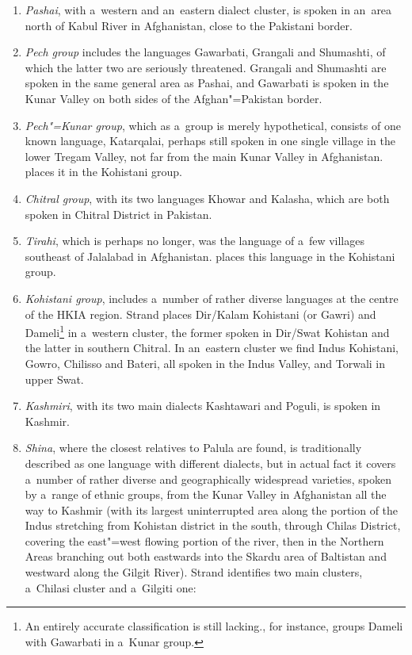 \begin{enumerate}
\item \textit{Pashai}, with a~western and an~eastern dialect cluster, is spoken in an~area north of Kabul River in Afghanistan, close to the Pakistani border. 


\item \textit{Pech group} includes the languages Gawarbati, Grangali and Shumashti, of which the latter two are seriously threatened. Grangali and Shumashti are spoken in the same general area as Pashai, and Gawarbati is spoken in the Kunar Valley on both sides of the Afghan"=Pakistan border. 


\item \textit{Pech"=Kunar group}, which as a~group is merely hypothetical, consists of one known language, Katarqalai, perhaps still spoken in one single village in the lower Tregam Valley, not far from the main Kunar Valley in Afghanistan. \citet[825]{bashir2003} places it in the Kohistani group.


\item \textit{Chitral group}, with its two languages Khowar and Kalasha, which are both spoken in Chitral District in Pakistan.


\item \textit{Tirahi}, which is perhaps no longer, was the language of a~few villages southeast of Jalalabad in Afghanistan. \citet[824]{bashir2003} places this language in the Kohistani group.


\item \textit{Kohistani group}, includes a~number of rather diverse languages at the centre of the HKIA region. Strand places Dir/Kalam Kohistani (or Gawri) and Dameli\footnote{An entirely accurate classification is still lacking.\citet[824]{bashir2003}, for instance, groups Dameli with Gawarbati in a~Kunar group.} in a~western cluster, the former spoken in Dir/Swat Kohistan and the latter in southern Chitral. In an~eastern cluster we find Indus Kohistani, Gowro, Chilisso and Bateri, all spoken in the Indus Valley, and Torwali in upper Swat.


\item \textit{Kashmiri}, with its two main dialects Kashtawari and Poguli, is spoken in Kashmir. 


\item \textit{Shina}, where the closest relatives to Palula are found, is traditionally described as one language with different dialects, but in actual fact it covers a~number of rather diverse and geographically widespread varieties, spoken by a~range of ethnic groups, from the Kunar Valley in Afghanistan all the way to Kashmir (with its largest uninterrupted area along the portion of the Indus stretching from Kohistan district in the south, through Chilas District, covering the east"=west flowing portion of the river, then in the Northern Areas branching out both eastwards into the Skardu area of Baltistan and westward along the Gilgit River). Strand identifies two main clusters, a~Chilasi cluster and a~Gilgiti one:


\end{enumerate}
